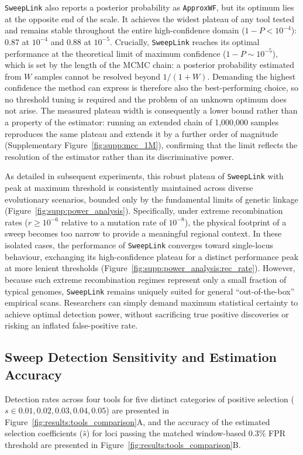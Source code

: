 \documentclass{article}
\newcommand{\SweepLink}{\texttt{SweepLink}\xspace}
\newcommand{\ApproxWF}{\texttt{ApproxWF}\xspace}
\begin{document}
\SweepLink also reports a posterior probability as \ApproxWF, but its optimum lies at the opposite end of the scale.
It achieves the widest plateau of any tool tested and remains stable throughout the entire high-confidence domain ($1-P < 10^{-4}$): 0.87 at $10^{-4}$ and 0.88 at $10^{-5}$.
Crucially, \SweepLink reaches its optimal performance at the theoretical limit of maximum confidence ($1-P \sim 10^{-5}$), which is set by the length of the MCMC chain: a posterior probability estimated from $W$ samples cannot be resolved beyond $1/(1+W)$.
Demanding the highest confidence the method can express is therefore also the best-performing choice, so no threshold tuning is required and the problem of an unknown optimum does not arise.
The measured plateau width is consequently a lower bound rather than a property of the estimator: running an extended chain of 1,000,000 samples reproduces the same plateau and extends it by a further order of magnitude (Supplementary Figure~\ref{fig:supp:mcc_1M}), confirming that the limit reflects the resolution of the estimator rather than its discriminative power.

As detailed in subsequent experiments, this robust plateau of \SweepLink with peak at maximum threshold is consistently maintained across diverse evolutionary scenarios, bounded only by the fundamental limits of genetic linkage (Figure~\ref*{fig:supp:power_analysis}).
Specifically, under extreme recombination rates ($r \ge 10^{-6}$ relative to a mutation rate of $10^{-8}$), the physical footprint of a sweep becomes too narrow to provide a meaningful regional context.
In these isolated cases, the performance of \SweepLink converges toward single-locus behaviour, exchanging its high-confidence plateau for a distinct performance peak at more lenient thresholds (Figure~\ref*{fig:supp:power_analysis:rec_rate}).
However, because such extreme recombination regimes represent only a small fraction of typical genomes, \SweepLink remains uniquely suited for general ``out-of-the-box'' empirical scans.
Researchers can simply demand maximum statistical certainty to achieve optimal detection power, without sacrificing true positive discoveries or risking an inflated false-positive rate.


\subsection{Sweep Detection Sensitivity and Estimation Accuracy}

Detection rates across four tools for five distinct categories of positive selection ($s \in {0.01, 0.02, 0.03, 0.04, 0.05}$) are presented in Figure~\ref{fig:results:tools_comparison}A, and the accuracy of the estimated selection coefficients ($\hat{s}$) for loci passing the matched window-based 0.3\% FPR threshold are presented in Figure~\ref{fig:results:tools_comparison}B.
\end{document}
